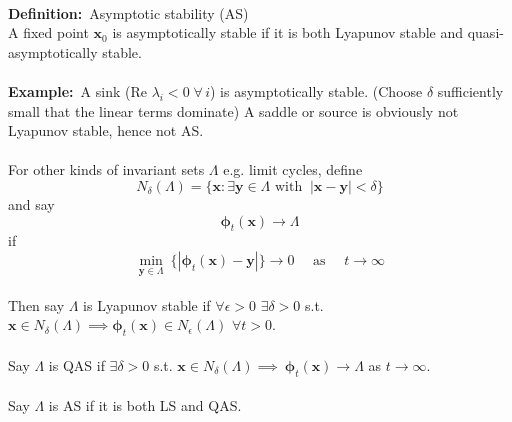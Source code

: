 \documentclass{article}
\newcommand{\example}{\textbf{Example:}}                    %
\newcommand{\definition}{\textbf{Definition:}}              %
\newcommand{\bp}{\bm{\phi}}                                 %
\begin{document}
\\
\definition\ Asymptotic stability (AS)
\\
A fixed point $\bm{x}_0$ is asymptotically stable if it is both Lyapunov stable
and quasi-asymptotically stable.
\\
\\
\example\ A sink (Re $\lambda_i <0 \; \forall \, i$) is asymptotically
stable. (Choose $\delta$ sufficiently small that the linear terms dominate)
A saddle or source is obviously not Lyapunov stable, hence not AS.
\\
\\
For other kinds of invariant sets $\Lambda$ e.g. limit cycles, define
\[ N_{\delta}(\Lambda) = \{ \bm{x} : \exists \bm{y} \in \Lambda \mbox{ with } \
|\bm{x} - \bm{y}| < \delta \} \]
and say 
\[ \bp_t(\bm{x}) \to \Lambda\]
if
\[\min_{\bm{y} \in \Lambda} \
\{ | \bp_t(\bm{x}) - \bm{y}| \} \to 0 \quad \mbox{ as } \quad t \to \infty \]
\\
Then say $\Lambda$ is Lyapunov stable if $\forall \epsilon > 0$ $\exists \delta>0$ s.t.
$\bm{x} \in N_{\delta}(\Lambda) \implies \bp_t(\bm{x}) \in N_{\epsilon}(\Lambda)$
$\forall t >0$.
\\
\\
Say $\Lambda$ is QAS if $\exists \delta >0$ s.t. $\bm{x} \in N_{\delta}(\Lambda) \implies \
\bp_t(\bm{x}) \to \Lambda$ as $t \to \infty$.
\\
\\
Say $\Lambda$ is AS if it is both LS and QAS.
\\
\end{document}
